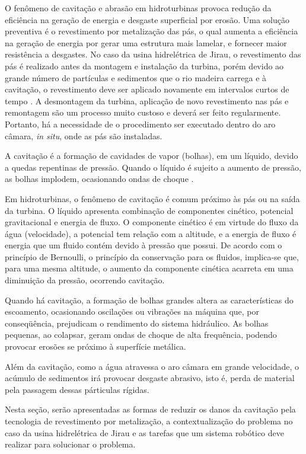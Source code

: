 O fenômeno de cavitação e abrasão em hidroturbinas provoca redução da eficiência
na geração de energia e desgaste superficial por erosão. Uma solução preventiva é
o revestimento por metalização das pás, o qual aumenta a eficiência na
geração de energia por gerar uma estrutura mais lamelar, e fornecer maior
resistência a desgastes. No caso da usina hidrelétrica de Jirau, o revestimento
das pás é realizado antes da montagem e instalação da turbina, porém devido ao grande número de
partículas e sedimentos que o rio madeira carrega e à cavitação, o revestimento
deve ser aplicado novamente em intervalos curtos de tempo
\citep{santa2009slurry}. A desmontagem da turbina, aplicação de novo
revestimento nas pás e remontagem são um processo muito custoso e deverá ser
feito regularmente. Portanto, há a necessidade de o procedimento ser
executado dentro do aro câmara, \textit{in situ}, onde as pás são instaladas.

A cavitação é a formação de cavidades de vapor (bolhas), em um líquido, devido a
quedas repentinas de pressão. Quando o líquido é sujeito a aumento de pressão,
as bolhas implodem, ocasionando ondas de choque \citep{brennen2013cavitation}.

Em hidroturbinas, o fenômeno de cavitação é comum próximo às pás ou
na saída da turbina. O líquido apresenta combinação
de componentes cinético, potencial gravitacional e energia de fluxo. O
componente cinético é em virtude do fluxo da água (velocidade), a potencial tem
relação com a altitude, e a energia de fluxo é energia que um fluido contém
devido à pressão que possui. De acordo com o princípio de Bernoulli, o princípio
da conservação para os fluidos, implica-se que, para uma mesma altitude, o
aumento da componente cinética acarreta em uma diminuição da pressão, ocorrendo
cavitação. 

Quando há cavitação, a formação de bolhas grandes altera as características do
escoamento, ocasionando oscilações ou vibrações na máquina que, por
conseqüência, prejudicam o rendimento do sistema hidráulico. As bolhas
pequenas, ao colapsar, geram ondas de choque de alta frequência, podendo provocar erosões se
próximo à superfície metálica.

Além da cavitação, como a água atravessa o aro câmara em grande velocidade, o
acúmulo de sedimentos irá provocar desgaste abrasivo, isto é, perda de material
pela passagem dessas párticulas rígidas. 

Nesta seção, serão apresentadas as formas de reduzir os danos da cavitação pela
tecnologia de revestimento por metalização, a contextualização do problema no
caso da usina hidrelétrica de Jirau e as tarefas que um sistema robótico deve
realizar para solucionar o problema.

